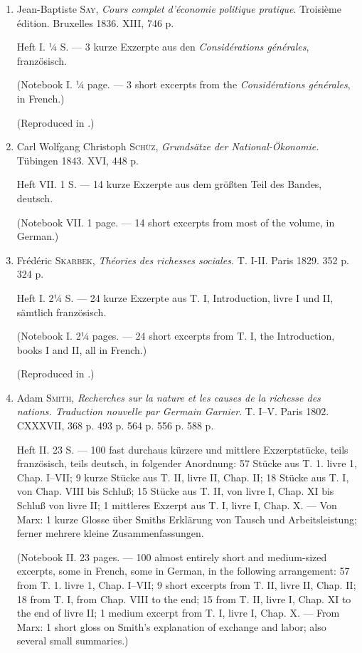 \begin{enumerate}
    (Reproduced in .)
    
    \item Jean-Baptiste \textsc{Say}, \textit{Cours complet d'économie politique pratique}. Troisième édition. Bruxelles 1836. XIII, 746 p.
    
    Heft I. ¼ S. --- 3 kurze Exzerpte aus den \textit{Considérations générales}, französisch.
    
    (Notebook I. ¼ page. --- 3 short excerpts from the \textit{Considérations générales}, in French.)
    
    (Reproduced in .)
    
    \item Carl Wolfgang Christoph \textsc{Schüz}, \textit{Grundsätze der National-Ökonomie.} Tübingen 1843. XVI, 448 p.
    
    Heft VII. 1 S. --- 14 kurze Exzerpte aus dem größten Teil des Bandes, deutsch.
    
    (Notebook VII. 1 page. --- 14 short excerpts from most of the volume, in German.)
    
    \item Frédéric \textsc{Skarbek}, \textit{Théories des richesses sociales.} T. I-II. Paris 1829. 352 p. 324 p.
    
    Heft I. 2¼ S. --- 24 kurze Exzerpte aus T. I, Introduction, livre I und II, sämtlich französisch.
    
    (Notebook I. 2¼ pages. --- 24 short excerpts from T. I, the Introduction, books I and II, all in French.)
    
    (Reproduced in .)
    
    \item Adam \textsc{Smith}, \textit{Recherches sur la nature et les causes de la richesse des nations. Traduction nouvelle par Germain Garnier}. T. I--V. Paris 1802. CXXXVII, 368 p. 493 p. 564 p. 556 p. 588 p.
    
    Heft II. 23 S. --- 100 fast durchaus kürzere und mittlere Exzerptstücke, teils französisch, teils deutsch, in folgender Anordnung: 57 Stücke aus T. 1. livre 1, Chap. I--VII; 9 kurze Stücke aus T. II, livre II, Chap. II; 18 Stücke aus T. I, von Chap. VIII bis Schluß; 15 Stücke aus T. II, von livre I, Chap. XI bis Schluß von livre II; 1 mittleres Exzerpt aus T. I, livre I, Chap. X. --- Von Marx: 1 kurze Glosse über Smiths Erklärung von Tausch und Arbeitsleistung; ferner mehrere kleine Zusammenfassungen.
    
    (Notebook II. 23 pages. --- 100 almost entirely short and medium-sized excerpts, some in French, some in German, in the following arrangement: 57 from T. 1. livre 1, Chap. I--VII; 9 short excerpts from T. II, livre II, Chap. II; 18 from T. I, from Chap. VIII to the end; 15 from T. II, livre I, Chap. XI to the end of livre II; 1 medium excerpt from T. I, livre I, Chap. X. --- From Marx: 1 short gloss on Smith's explanation of exchange and labor; also several small summaries.)
    

\end{enumerate}
